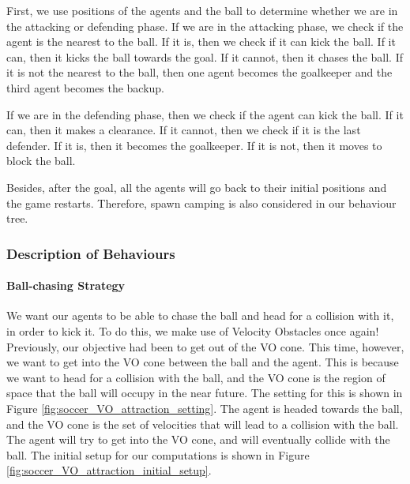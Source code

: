 \documentclass[a4paper,12pt]{article}
\begin{document}


First, we use positions of the agents and the ball to determine whether we are in the attacking or defending phase. 
If we are in the attacking phase, we check if the agent is the nearest to the ball. 
If it is, then we check if it can kick the ball. If it can, then it kicks the ball towards the goal. 
If it cannot, then it chases the ball. If it is not the nearest to the ball, then one agent becomes the goalkeeper and the third agent becomes the backup. 

If we are in the defending phase, then we check if the agent can kick the ball. If it can, then it makes a clearance. 
If it cannot, then we check if it is the last defender. 
If it is, then it becomes the goalkeeper. If it is not, then it moves to block the ball.

Besides, after the goal, all the agents will go back to their initial positions and the game restarts. Therefore, spawn camping is also considered in our behaviour tree.


\subsubsection{Description of Behaviours}

\paragraph{Ball-chasing Strategy}
\label{method_ball_chasing}
We want our agents to be able to chase the ball and head for a collision with it, in order to kick it. To do this, we make use of Velocity Obstacles once again! Previously, our objective had been to get out of the VO cone. This time, however, we want to get into the VO cone between the ball and the agent. This is because we want to head for a collision with the ball, and the VO cone is the region of space that the ball will occupy in the near future. The setting for this is shown in Figure \ref{fig:soccer_VO_attraction_setting}. The agent is headed towards the ball, and the VO cone is the set of velocities that will lead to a collision with the ball. The agent will try to get into the VO cone, and will eventually collide with the ball. The initial setup for our computations is shown in Figure \ref{fig:soccer_VO_attraction_initial_setup}.
\end{document}
